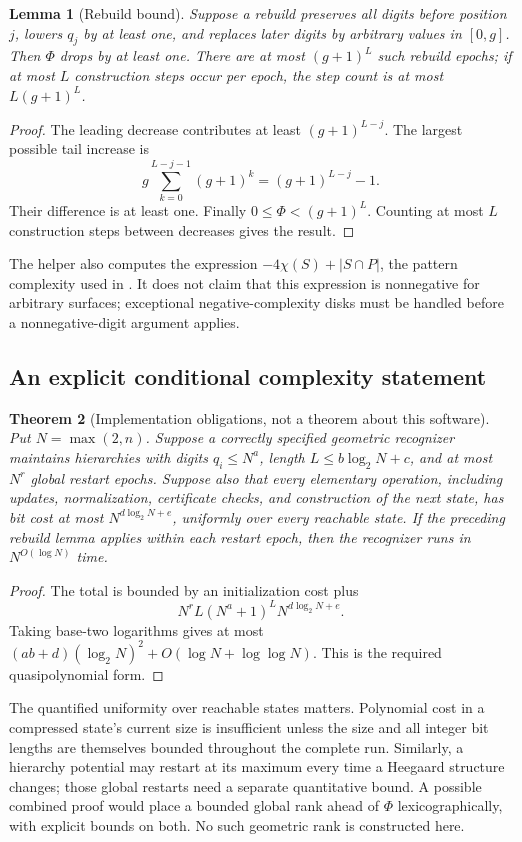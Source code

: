 \documentclass[11pt]{article}
\newtheorem{theorem}{Theorem}[section]
\newtheorem{lemma}[theorem]{Lemma}
\theoremstyle{definition}
\begin{document}
\begin{lemma}[Rebuild bound]
Suppose a rebuild preserves all digits before position $j$, lowers $q_j$ by at
least one, and replaces later digits by arbitrary values in $[0,g]$. Then
$\Phi$ drops by at least one. There are at most $(g+1)^L$ such rebuild epochs;
if at most $L$ construction steps occur per epoch, the step count is at most
$L(g+1)^L$.
\end{lemma}
\begin{proof}
The leading decrease contributes at least $(g+1)^{L-j}$. The largest possible
tail increase is
\[
 g\sum_{k=0}^{L-j-1}(g+1)^k=(g+1)^{L-j}-1.
\]
Their difference is at least one. Finally $0\le\Phi<(g+1)^L$. Counting at most
$L$ construction steps between decreases gives the result.
\end{proof}

The helper also computes the expression
$-4\chi(S)+|S\cap P|$, the pattern complexity used in
\cite[Definition 3.4]{hierarchies}. It does not claim that this expression is
nonnegative for arbitrary surfaces; exceptional negative-complexity disks
must be handled before a nonnegative-digit argument applies.

\subsection{An explicit conditional complexity statement}

\begin{theorem}[Implementation obligations, not a theorem about this software]
Put $N=\max(2,n)$. Suppose a correctly specified geometric recognizer maintains
hierarchies with digits $q_i\le N^a$, length $L\le b\log_2N+c$, and at most
$N^r$ global restart epochs. Suppose also that every elementary operation,
including updates, normalization, certificate checks, and construction of the
next state, has bit cost at most $N^{d\log_2N+e}$, uniformly over every reachable
state. If the preceding rebuild lemma applies within each restart epoch, then
the recognizer runs in $N^{O(\log N)}$ time.
\end{theorem}
\begin{proof}
The total is bounded by an initialization cost plus
\[
 N^r L(N^a+1)^L N^{d\log_2N+e}.
\]
Taking base-two logarithms gives at most
$(ab+d)(\log_2N)^2+O(\log N+\log\log N)$.
This is the required quasipolynomial form.
\end{proof}

The quantified uniformity over reachable states matters. Polynomial cost in
a compressed state's current size is insufficient unless the size and all
integer bit lengths are themselves bounded throughout the complete run.
Similarly, a hierarchy potential may restart at its maximum every time a
Heegaard structure changes; those global restarts need a separate quantitative
bound. A possible combined proof would place a bounded global rank ahead of
$\Phi$ lexicographically, with explicit bounds on both. No such geometric rank
is constructed here.
\end{document}
